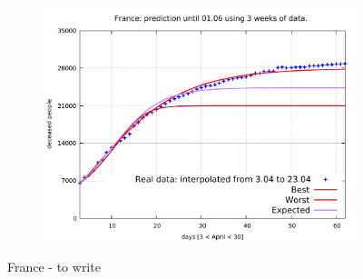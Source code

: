 \documentclass[8pt]{article}
\begin{document}
\begin{figure}[h!]
\begin{subfigure}[b]{0.45\linewidth}
  \includegraphics[width=\linewidth]{../err10p_simulations/fr/3-23/3-23.pdf}
  \end{subfigure}
	\caption{France - to write}
\end{figure}
\end{document}
